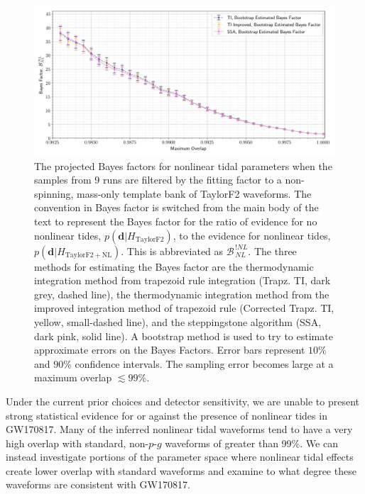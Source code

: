 \begin{figure}[th]
\includegraphics[width=\columnwidth]{figs/chapter6/bootstrap_bayes_ff_cuts_average.png}\caption{The projected Bayes factors for nonlinear tidal parameters when the samples from 9 runs are filtered by the fitting factor to a non-spinning, mass-only template bank of TaylorF2 waveforms. The convention in Bayes factor is switched from the main body of the text to represent the Bayes factor for the ratio of evidence for no nonlinear tides, $p\left(\mathbf{d}|H_\mathrm{TaylorF2}\right)$, to the evidence for nonlinear tides, $p\left(\mathbf{d}|H_\mathrm{TaylorF2+NL}\right)$. This is abbreviated as $\mathcal{B}^{\,!NL}_{\,NL}$. The three methods for estimating the Bayes factor are the thermodynamic integration method from trapezoid rule integration (Trapz. TI, dark grey, dashed line), the thermodynamic integration method from the improved integration method of trapezoid rule (Corrected Trapz. TI, yellow, small-dashed line), and the steppingstone algorithm (SSA, dark pink, solid line). A bootstrap method is used to try to estimate approximate errors on the Bayes Factors. Error bars represent $10$\% and $90$\% confidence intervals. The sampling error becomes large at a maximum overlap $\lesssim 99$\%.
}
\label{fig:bayes_ff_plot}
\end{figure}

Under the current prior choices and detector sensitivity, we are unable to present strong statistical evidence for or against the presence of nonlinear tides in GW170817. Many of the inferred nonlinear tidal waveforms tend to have a very high overlap with standard, non-$p$-$g$ waveforms of greater than 99\%. We can instead investigate portions of the parameter space where nonlinear tidal effects create lower overlap with standard waveforms and examine to what degree these waveforms are consistent with GW170817.

